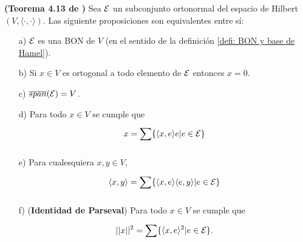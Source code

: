 \begin{teo} \label{thm: Coway, 4.13}
\textbf{(Teorema 4.13 de \cite{conway} )}
Sea $\mathcal{E}$ un subconjunto ortonormal del espacio
de Hilbert $(V, \langle \cdot , \cdot \rangle)$.
Las siguiente proposiciones son equivalentes entre sí:
\begin{itemize}
\item[a)] $\mathcal{E}$ es una BON de $V$ (en el sentido
de la definición \ref{defi: BON y base de Hamel}).
\item[b)] Si $x \in V$ es ortogonal a todo elemento de 
$\mathcal{E}$ entonces $x=0$.
\item[c)] $\overline{span}(\mathcal{E})= V$.
\item[d)] Para todo $x \in V$ se cumple que
\[
x = \sum\limits_{}^{}\{ \langle x,e \rangle e | e \in \mathcal{E} \}
\]
\item[e)] Para cualesquiera $x, y \in V$,
\[
\langle x,y \rangle= \sum\limits_{}^{}\{ \langle x,e \rangle  \langle e,y \rangle | e \in \mathcal{E} \}
\]
\item[f)](\textbf{Identidad de Parseval})
Para todo $x \in V$ se cumple que
\[
||x||^{2}= \sum\limits_{}^{}\{ \langle x,e \rangle ^{2} | e \in \mathcal{E} \}.
\]
\end{itemize}
\end{teo}

